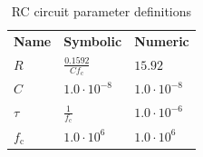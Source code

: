 \begin{table}[h]
\centering
\begin{tabular}[c]{lll}
\textbf{Name} & \textbf{Symbolic} & \textbf{Numeric} \\ 
\rowcolor{myyellow}
$R$ &$\frac{0.1592}{C f_{\mathrm{c}}}$ &$15.92$ \\ 
$C$ &$1.0 \cdot 10^{-8}$ &$1.0 \cdot 10^{-8}$ \\ 
\rowcolor{myyellow}
$\tau$ &$\frac{1}{f_{\mathrm{c}}}$ &$1.0 \cdot 10^{-6}$ \\ 
$f_{\mathrm{c}}$ &$1.0 \cdot 10^{6}$ &$1.0 \cdot 10^{6}$ \\ 
\end{tabular}
\caption{RC circuit parameter definitions}
\end{table}

